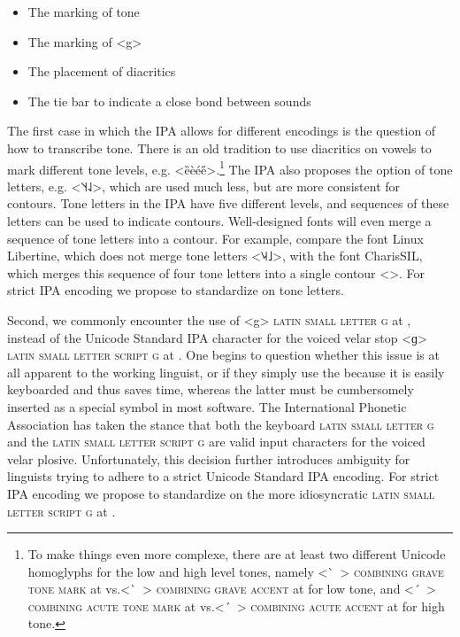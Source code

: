 \begin{itemize}
  \item The marking of tone
  \item The marking of <g>
  \item The placement of diacritics
  \item The tie bar to indicate a close bond between sounds
\end{itemize}

The first case in which the IPA allows for different encodings is the question
of how to transcribe tone. There is an old tradition to use diacritics on vowels
to mark different tone levels, e.g. <ȅèée̋>.\footnote{To make things even more
complexe, there are at least two different Unicode homoglyphs for the low and
high level tones, namely <\ ̀~> \textsc{combining grave tone mark} at
 vs.\@ <\ ̀~> \textsc{combining grave accent} at  for low
tone, and <\ ́~> \textsc{combining acute tone mark} at  vs.\@ <\ ́~>
\textsc{combining acute accent} at  for high tone.} The IPA also
proposes the option of tone letters, e.g. <˥˦˧˨˩>, which are used much less, but
are more consistent for contours. Tone letters in the IPA have five different levels, and
sequences of these letters can be used to indicate contours. Well-designed fonts
will even merge a sequence of tone letters into a contour. For example, compare
the font Linux Libertine, which does not merge tone letters
<{˥˨˧˩}>, with the font CharisSIL, which merges this
sequence of four tone letters into a single contour <>. For strict
IPA encoding we propose to standardize on tone letters.

Second, we commonly encounter the use of <g> \textsc{latin small letter g} at
, instead of the Unicode Standard IPA character for the voiced velar
stop <ɡ> \textsc{latin small letter script g} at . One begins to
question whether this issue is at all apparent to the working linguist, or if
they simply use the  because it is easily keyboarded and thus saves
time, whereas the latter must be cumbersomely inserted as a special symbol in
most software. The International Phonetic
Association has taken the stance that both the keyboard \textsc{latin small
letter g} and the \textsc{latin small letter script g} are valid input
characters for the voiced velar plosive. Unfortunately, this decision further
introduces ambiguity for linguists trying to adhere to a strict Unicode Standard
IPA encoding. For strict IPA encoding we propose to standardize on the more 
idiosyncratic \textsc{latin small letter script g} at .

